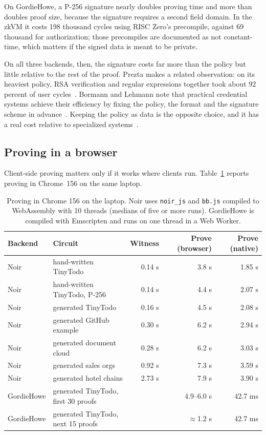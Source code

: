\documentclass[11pt]{article}
\begin{document}
On GordieHowe, a P-256 signature nearly doubles proving time and more than doubles proof size, because the signature requires a second field domain. In the zkVM it costs 198 thousand cycles using RISC Zero's precompile, against 69 thousand for authorization; those precompiles are documented as not constant-time, which matters if the signed data is meant to be private.

On all three backends, then, the signature costs far more than the policy but little relative to the rest of the proof. Prezta makes a related observation: on its heaviest policy, RSA verification and regular expressions together took about 92 percent of user cycles~\citep{wei2026prezta}. Bormann and Lehmann note that practical credential systems achieve their efficiency by fixing the policy, the format and the signature scheme in advance~\citep{bormann2026sok}. Keeping the policy as data is the opposite choice, and it has a real cost relative to specialized systems~\citep{sharp2026gordiehowe,kaviani2026vega}.

\subsection{Proving in a browser}
\label{sec:browser}

Client-side proving matters only if it works where clients run. Table~\ref{tab:browser} reports proving in Chrome~156 on the same laptop.

\begin{table}[t]
\centering
\caption{Proving in Chrome 156 on the laptop. Noir uses \texttt{noir\_js} and \texttt{bb.js} compiled to WebAssembly with 10 threads (medians of five or more runs). GordieHowe is compiled with Emscripten and runs on one thread in a Web Worker.}
\label{tab:browser}
\begin{tabular}{@{}llrrr@{}}
\toprule
Backend & Circuit & Witness & Prove (browser) & Prove (native) \\
\midrule
Noir & hand-written TinyTodo & 0.14 s & 3.8 s & 1.85 s \\
Noir & hand-written TinyTodo, P-256 & 0.14 s & 4.4 s & 2.07 s \\
Noir & generated TinyTodo & 0.16 s & 4.5 s & 2.08 s \\
Noir & generated GitHub example & 0.30 s & 6.2 s & 2.94 s \\
Noir & generated document cloud & 0.28 s & 6.2 s & 3.03 s \\
Noir & generated sales orgs & 0.92 s & 7.3 s & 3.59 s \\
Noir & generated hotel chains & 2.73 s & 7.9 s & 3.90 s \\
GordieHowe & generated TinyTodo, first 30 proofs & & 4.9--6.0 s & 42.7 ms \\
GordieHowe & generated TinyTodo, next 15 proofs & & $\approx$1.2 s & 42.7 ms \\
\bottomrule
\end{tabular}
\end{table}
\end{document}
